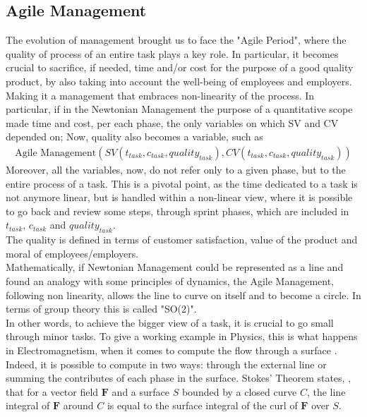 \documentclass{article}
\begin{document}
\subsection{Agile Management}
The evolution of management brought us to face the "Agile Period", where the quality of process of an entire task plays a key role. In particular, it becomes crucial to sacrifice, if needed, time and/or cost for the purpose of a good quality product, by also taking into account the well-being of employees and employers.\\ Making it a management that embraces non-linearity of the process.
In particular, if in the Newtonian Management the purpose of a quantitative scope made time and cost, per each phase, the only variables on which SV and CV depended on; Now, quality also becomes a variable, such as
\begin{align}
    \text{Agile Management}(SV(t_{task}, c_{task}, quality_{task}), CV(t_{task}, c_{task}, quality_{task}))
\end{align}
Moreover, all the variables, now, do not refer only to a given phase, but to the entire process of a task. This is a pivotal point, as the time dedicated to a task is not anymore linear, but is handled within a non-linear view, where it is possible to go back and review some steps, through sprint phases, which are included in $t_{task}$, $c_{task}$ and $quality_{task}$.\\
The quality is defined in terms of customer satisfaction, value of the product and moral of employees/employers.\\
Mathematically, if Newtonian Management could be represented as a line and found an analogy with some principles of dynamics, the Agile Management, following non linearity, allows the line to curve on itself and to become a circle. In terms of group theory this is called "SO(2)".\\In other words, to achieve the bigger view of a task, it is crucial to go small through minor tasks. To give a working example in Physics, this is what happens in Electromagnetism, when it comes to compute the flow through a surface \cite{hankel1861flssigkeiten}.
Indeed, it is possible to compute in two ways: through the external line or summing the contributes of each phase in the surface. 
Stokes' Theorem states, \cite{hankel1861flssigkeiten}, that for a vector field $\mathbf{F}$ and a surface $S$ bounded by a closed curve $C$, the line integral of $\mathbf{F}$ around $C$ is equal to the surface integral of the curl of $\mathbf{F}$ over $S$.
\end{document}
